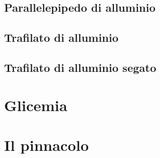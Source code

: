 \documentclass{article}
\begin{document}
    \subsection{Parallelepipedo di alluminio}
    \subsection{Trafilato di alluminio}
    \subsection{Trafilato di alluminio segato}

\section{Glicemia}

\section{Il pinnacolo}
\end{document}
